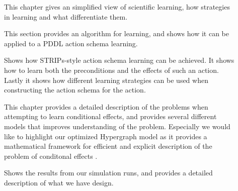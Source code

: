 \documentclass[Master.tex]{subfiles}
\begin{document}
 \begin{description}
 	\item[]
	 	This chapter gives an simplified view of scientific learning, how strategies in learning and what differentiate them.  
	\item[]
		This section provides an algorithm for learning, and shows how it can be applied to a PDDL action schema learning.
	\item[]
		Shows how STRIPs-style action schema learning can be achieved. It shows how to learn both the preconditions and the effects of such an action. Lastly it shows how different learning strategies can be used when constructing the action schema for the action.
		
	\item[]
		This chapter provides a detailed description of the problems when attempting to learn conditional effects, and provides several different models that improves understanding of the problem. Especially we would like to highlight our optimized Hypergraph model as it provides a mathematical framework for efficient and explicit description of the problem of conditonal effects .
	
	\item[]
		Shows the results from our simulation runs, and provides a detailed description of what we have design.
 
\end{description}
	

%
%
%
%
%
%
%
\end{document}
